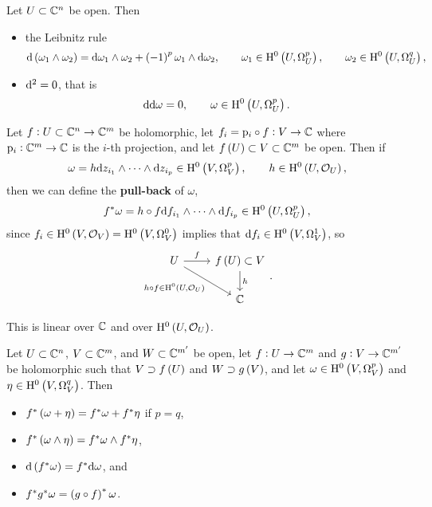 \begin{proposition}
Let $ U \subset \mathbb{C}^n $ be open. Then
\begin{itemize}
\item the Leibnitz rule
$$ \d\br{\omega_1 \wedge \omega_2} = \d\omega_1 \wedge \omega_2 + \br{-1}^p \omega_1 \wedge \d\omega_2, \qquad \omega_1 \in \H^0\br{U, \Omega_U^p}, \qquad \omega_2 \in \H^0\br{U, \Omega_U^q}, $$
\item $ \mathrm{d}^2 = 0 $, that is
$$ \d\d\omega = 0, \qquad \omega \in \H^0\br{U, \Omega_U^p}. $$
\end{itemize}
\end{proposition}

\pagebreak

\begin{definition}
Let $ f : U \subset \mathbb{C}^n \to \mathbb{C}^m $ be holomorphic, let $ f_i = \mathrm{p}_i \circ f : V \to \mathbb{C} $ where $ \mathrm{p}_i : \mathbb{C}^m \to \mathbb{C} $ is the $ i $-th projection, and let $ f\br{U} \subset V \subset \CC^m $ be open. Then if
$$ \omega = h\d z_{i_1} \wedge \dots \wedge \d z_{i_p} \in \H^0\br{V, \Omega_V^p}, \qquad h \in \H^0\br{U, \OOO_U}, $$
then we can define the \textbf{pull-back} of $ \omega $,
$$ f^*\omega = h \circ f\d f_{i_1} \wedge \dots \wedge \d f_{i_p} \in \H^0\br{U, \Omega_U^p}, $$
since $ f_i \in \H^0\br{V, \OOO_V} = \H^0\br{V, \Omega_V^0} $ implies that $ \d f_i \in \H^0\br{V, \Omega_V^1} $, so
$$
\begin{tikzcd}
U \arrow{r}{f} \arrow[swap]{dr}{h \circ f \in \H^0\br{U, \OOO_U}} & f\br{U} \subset V \arrow{d}{h} \\
& \CC
\end{tikzcd}.
$$
\end{definition}

This is linear over $ \mathbb{C} $ and over $ \H^0\br{U, \OOO_U} $.

\begin{proposition}
Let $ U \subset \mathbb{C}^n $, $ V \subset \mathbb{C}^m $, and $ W \subset \mathbb{C}^{m'} $ be open, let $ f : U \to \mathbb{C}^m $ and $ g : V \to \mathbb{C}^{m'} $ be holomorphic such that $ V \supset f\br{U} $ and $ W \supset g\br{V} $, and let $ \omega \in \H^0\br{V, \Omega_V^p} $ and $ \eta \in \H^0\br{V, \Omega_V^q} $. Then
\begin{itemize}
\item $ f^*\br{\omega + \eta} = f^*\omega + f^*\eta $ if $ p = q $,
\item $ f^*\br{\omega \wedge \eta} = f^*\omega \wedge f^*\eta $,
\item $ \d\br{f^*\omega} = f^*\d\omega $, and
\item $ f^*g^*\omega = \br{g \circ f}^*\omega $.
\end{itemize}
\end{proposition}

